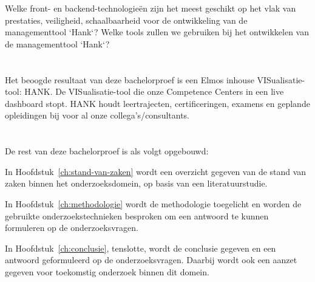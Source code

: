 Welke front- en backend-technologieën zijn het meest geschikt op het vlak van prestaties, veiligheid, schaalbaarheid voor de ontwikkeling van de managementtool `Hank`?
Welke tools zullen we gebruiken bij het ontwikkelen van de managementtool `Hank`?

\section{}%
\label{sec:onderzoeksdoelstelling}


Het beoogde resultaat van deze bachelorproef is een Elmos inhouse
VISualisatie-tool: HANK. De VISualisatie-tool die onze Competence Centers in
een live dashboard stopt. HANK houdt leertrajecten, certificeringen, examens en
geplande opleidingen bij voor al onze collega's/consultants.
\section{}%
\label{sec:opzet-bachelorproef}


De rest van deze bachelorproef is als volgt opgebouwd:

In Hoofdstuk~\ref{ch:stand-van-zaken} wordt een overzicht gegeven van de stand
van zaken binnen het onderzoeksdomein, op basis van een literatuurstudie.

In Hoofdstuk~\ref{ch:methodologie} wordt de methodologie toegelicht en worden
de gebruikte onderzoekstechnieken besproken om een antwoord te kunnen
formuleren op de onderzoeksvragen.


In Hoofdstuk~\ref{ch:conclusie}, tenslotte, wordt de conclusie gegeven en een
antwoord geformuleerd op de onderzoeksvragen. Daarbij wordt ook een aanzet
gegeven voor toekomstig onderzoek binnen dit domein.